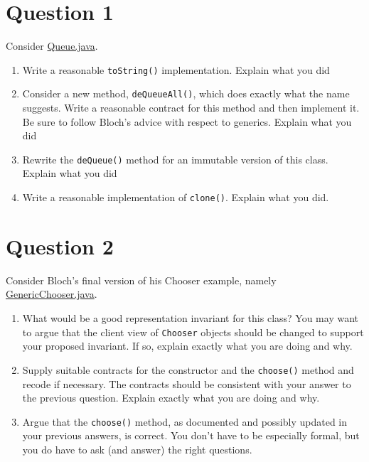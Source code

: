 \documentclass[10pt]{article}
\begin{document}
\newpage
\section{Question 1}
Consider \href{https://nguyenthanhvuh.github.io/class-oo/files/Queue.java}{Queue.java}.



\begin{enumerate}
\item
Write a reasonable \texttt{toString()} implementation. Explain what you did

\item
Consider a new method, \texttt{deQueueAll()}, which does exactly  what the name suggests. Write a reasonable contract for this method and then implement it.  Be sure to follow Bloch's advice with respect to generics. 
Explain what you did

\item
Rewrite the \texttt{deQueue()} method for an immutable version of this class. Explain what you did

\item
Write a reasonable implementation of \texttt{clone()}. Explain what you did. 


\end{enumerate}
\newpage
\section{Question 2}

Consider Bloch's final version of his Chooser example, namely  \href{https://nguyenthanhvuh.github.io/class-oo/files/GenericChooser.java}{GenericChooser.java}.


\begin{enumerate}
\item
What would be a good representation invariant for this class?
You may want to argue that the client
view of {\tt Chooser} objects  should be changed to support 
your proposed invariant.
If so, explain exactly what you are doing and why.
\item
Supply suitable contracts for the constructor and the {\tt choose()} method
and recode if necessary.
The contracts should be consistent with your answer to the previous question.
Explain exactly what you are doing and why.
\item
Argue that the {\tt choose()} method, as documented and possibly updated
in your previous answers, is correct.  
You don't have to be especially formal, but you do have
to ask (and answer) the right questions.  
\end{enumerate}
\end{document}
